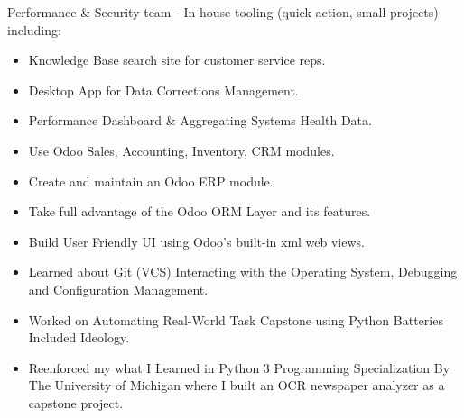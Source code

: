 \documentclass[10pt,a4paper,ragged2e,withhyper]{altacv}
\begin{document}
\begin{paracol}{2}


   Performance \& Security team - In-house tooling (quick action, small projects) including:
   \begin{itemize}
      \item Knowledge Base search site for customer service reps.
      \item Desktop App for Data Corrections Management.
      \item Performance Dashboard \& Aggregating Systems Health Data.
   \end{itemize}

 

   \begin{itemize}
      \item Use Odoo Sales, Accounting, Inventory, CRM modules.
      \item Create and maintain an Odoo ERP module.
      \item Take full advantage of the Odoo ORM Layer and its features.
      \item Build User Friendly UI using Odoo's built-in xml web views.
   \end{itemize}

   \divider



   \begin{itemize}
      \item Learned about Git (VCS) Interacting with the Operating System, Debugging and Configuration Management.
      \item Worked on Automating Real-World Task Capstone using Python Batteries Included Ideology.
      \item Reenforced my what I Learned in Python 3 Programming Specialization By The University of Michigan where I built an OCR newspaper analyzer as a capstone project.
   \end{itemize}
   \divider


\end{paracol}
\end{document}
